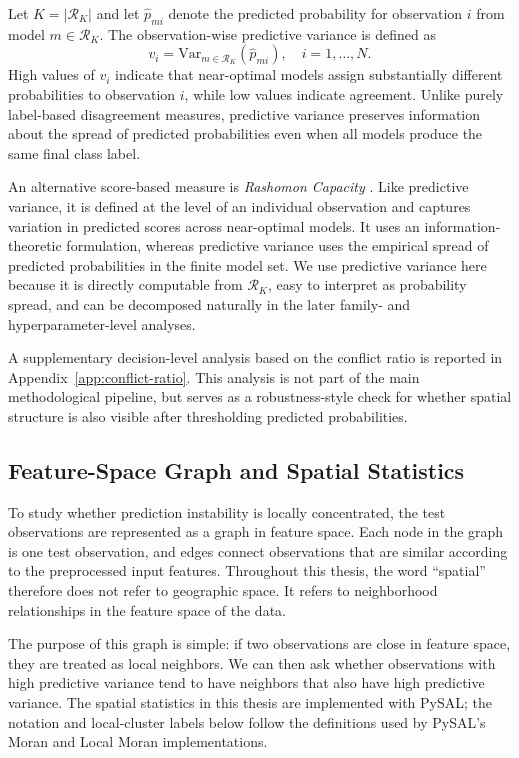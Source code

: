 Let $K = |\mathcal{R}_K|$ and let $\hat{p}_{mi}$ denote the predicted probability for
observation $i$ from model $m \in \mathcal{R}_K$. The observation-wise predictive
variance is defined as
\[
v_i = \mathrm{Var}_{m \in \mathcal{R}_K}(\hat{p}_{mi}),
\quad i = 1,\dots,N.
\]
High values of $v_i$ indicate that near-optimal models assign substantially different
probabilities to observation $i$, while low values indicate agreement. Unlike purely
label-based disagreement measures, predictive variance preserves information about the
spread of predicted probabilities even when all models produce the same final class label.

An alternative score-based measure is \emph{Rashomon Capacity}
\citep{hsu_rashomon_nodate}. Like predictive variance, it is defined at the level of an
individual observation and captures variation in predicted scores across near-optimal
models. It uses an information-theoretic formulation, whereas predictive variance uses the
empirical spread of predicted probabilities in the finite model set. We use predictive
variance here because it is directly computable from $\mathcal{R}_K$, easy to interpret as
probability spread, and can be decomposed naturally in the later family- and
hyperparameter-level analyses.

A supplementary decision-level analysis based on the conflict ratio is reported in
Appendix~\ref{app:conflict-ratio}. This analysis is not part of the main methodological
pipeline, but serves as a robustness-style check for whether spatial structure is also visible
after thresholding predicted probabilities.

\subsection{Feature-Space Graph and Spatial Statistics}
\label{sec:meth-graph}

To study whether prediction instability is locally concentrated, the test observations are
represented as a graph in feature space. Each node in the graph is one test observation,
and edges connect observations that are similar according to the preprocessed input
features. Throughout this thesis, the word ``spatial'' therefore does not refer to geographic
space. It refers to neighborhood relationships in the feature space of the data.

The purpose of this graph is simple: if two observations are close in feature space, they
are treated as local neighbors. We can then ask whether observations with high predictive
variance tend to have neighbors that also have high predictive variance. The spatial
statistics in this thesis are implemented with PySAL; the notation and local-cluster labels
below follow the definitions used by PySAL's Moran and Local Moran implementations.

